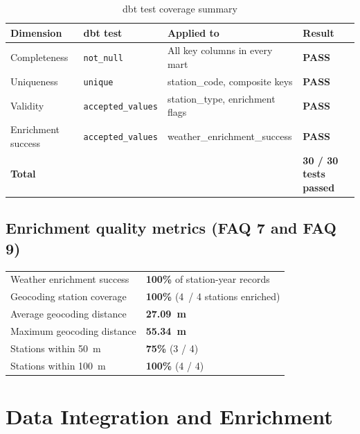 \documentclass[11pt,a4paper]{article}
\begin{document}
\begin{table}[h!]
\centering
\caption{dbt test coverage summary}
\small
{}
\begin{tabularx}{\textwidth}{@{}lllX@{}}
\toprule
\textbf{Dimension}   & \textbf{dbt test}          & \textbf{Applied to}             & \textbf{Result} \\
\midrule
Completeness         & \texttt{not\_null}         & All key columns in every mart   & \textcolor{accentgreen}{\bfseries PASS} \\
Uniqueness           & \texttt{unique}            & station\_code, composite keys    & \textcolor{accentgreen}{\bfseries PASS} \\
Validity             & \texttt{accepted\_values} & station\_type, enrichment flags  & \textcolor{accentgreen}{\bfseries PASS} \\
Enrichment success   & \texttt{accepted\_values} & weather\_enrichment\_success     & \textcolor{accentgreen}{\bfseries PASS} \\
\midrule
\multicolumn{3}{l}{\textbf{Total}} & \textbf{30 / 30 tests passed} \\
\bottomrule
\end{tabularx}
\end{table}

\subsection{Enrichment quality metrics (FAQ 7 and FAQ 9)}

\begin{tcolorbox}[answerbox,title=Measured quality evidence]
\renewcommand{\arraystretch}{1.3}
\begin{tabular}{@{}ll@{}}
Weather enrichment success        & \textbf{100\%} of station-year records \\
Geocoding station coverage        & \textbf{100\%} (4~/ 4 stations enriched) \\
Average geocoding distance        & \textbf{27.09~m} \\
Maximum geocoding distance        & \textbf{55.34~m} \\
Stations within 50~m              & \textbf{75\%} (3 / 4) \\
Stations within 100~m             & \textbf{100\%} (4 / 4) \\
\end{tabular}
\end{tcolorbox}

\section{Data Integration and Enrichment}
\end{document}

